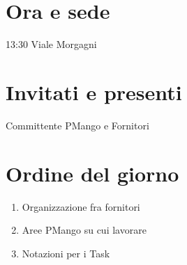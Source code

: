 \section*{Ora e sede}
13:30 Viale Morgagni
\section*{Invitati e presenti}
Committente PMango e Fornitori
\section*{Ordine del giorno}
\begin{enumerate}
\item Organizzazione fra fornitori
\item Aree PMango su cui lavorare
\item Notazioni per i Task
\end{enumerate}

